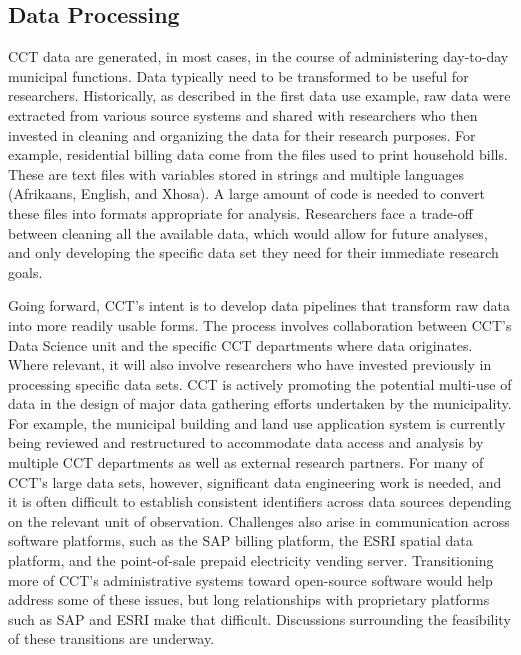 \hypertarget{data-processing}{%
\subsection{Data Processing}\label{data-processing}}

CCT data are generated, in most cases, in the course of administering day-to-day municipal functions. Data typically need to be transformed to be useful for researchers. Historically, as described in the first data use example, raw data were extracted from various source systems and shared with researchers who then invested in cleaning and organizing the data for their research purposes. For example, residential billing data come from the files used to print household bills. These are text files with variables stored in strings and multiple languages (Afrikaans, English, and Xhosa). A large amount of code is needed to convert these files into formats appropriate for analysis. Researchers face a trade-off between cleaning all the available data, which would allow for future analyses, and only developing the specific data set they need for their immediate research goals.

Going forward, CCT's intent is to develop data pipelines that transform raw data into more readily usable forms. The process involves collaboration between CCT's Data Science unit and the specific CCT departments where data originates. Where relevant, it will also involve researchers who have invested previously in processing specific data sets. CCT is actively promoting the potential multi-use of data in the design of major data gathering efforts undertaken by the municipality. For example, the municipal building and land use application system is currently being reviewed and restructured to accommodate data access and analysis by multiple CCT departments as well as external research partners. For many of CCT's large data sets, however, significant data engineering work is needed, and it is often difficult to establish consistent identifiers across data sources depending on the relevant unit of observation. Challenges also arise in communication across software platforms, such as the SAP billing platform, the ESRI spatial data platform, and the point-of-sale prepaid electricity vending server. Transitioning more of CCT's administrative systems toward open-source software would help address some of these issues, but long relationships with proprietary platforms such as SAP and ESRI make that difficult. Discussions surrounding the feasibility of these transitions are underway.

